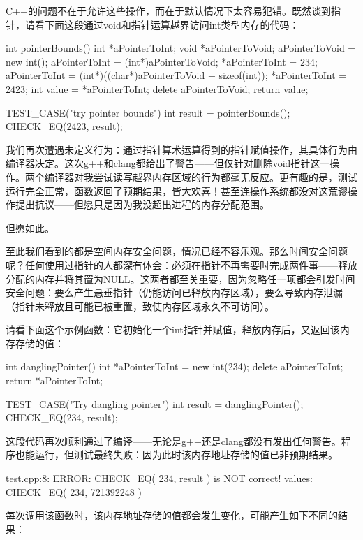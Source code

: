 C++的问题不在于允许这些操作，而在于默认情况下太容易犯错。既然谈到指针，请看下面这段通过void和指针运算越界访问int类型内存的代码：

\begin{cpp}
int pointerBounds() {
  int *aPointerToInt;
  void *aPointerToVoid;
  aPointerToVoid = new int();
  aPointerToInt = (int*)aPointerToVoid;
  *aPointerToInt = 234;
  aPointerToInt = (int*)((char*)aPointerToVoid + sizeof(int));
  *aPointerToInt = 2423;
  int value = *aPointerToInt;
  delete aPointerToVoid;
  return value;
}

TEST_CASE("try pointer bounds"){
  int result = pointerBounds();
  CHECK_EQ(2423, result);
}
\end{cpp}

我们再次遭遇未定义行为：通过指针算术运算得到的指针赋值操作，其具体行为由编译器决定。这次g++和clang都给出了警告——但仅针对删除void指针这一操作。两个编译器对我尝试读写越界内存区域的行为都毫无反应。更有趣的是，测试运行完全正常，函数返回了预期结果，皆大欢喜！甚至连操作系统都没对这荒谬操作提出抗议——但愿只是因为我没超出进程的内存分配范围。

但愿如此。

至此我们看到的都是空间内存安全问题，情况已经不容乐观。那么时间安全问题呢？任何使用过指针的人都深有体会：必须在指针不再需要时完成两件事——释放分配的内存并将其置为NULL。这两者都至关重要，因为忽略任一项都会引发时间安全问题：要么产生悬垂指针（仍能访问已释放内存区域），要么导致内存泄漏（指针未释放且可能已被重置，致使内存区域永久不可访问）。

请看下面这个示例函数：它初始化一个int指针并赋值，释放内存后，又返回该内存存储的值：

\begin{cpp}
int danglingPointer() {
  int *aPointerToInt = new int(234);
  delete aPointerToInt;
  return *aPointerToInt;
}

TEST_CASE("Try dangling pointer"){
  int result = danglingPointer();
  CHECK_EQ(234, result);
}
\end{cpp}

这段代码再次顺利通过了编译——无论是g++还是clang都没有发出任何警告。程序也能运行，但测试最终失败：因为此时该内存地址存储的值已非预期结果。

\begin{shell}
test.cpp:8: ERROR: CHECK_EQ( 234, result ) is NOT correct!
  values: CHECK_EQ( 234, 721392248 )
\end{shell}

每次调用该函数时，该内存地址存储的值都会发生变化，可能产生如下不同的结果：

